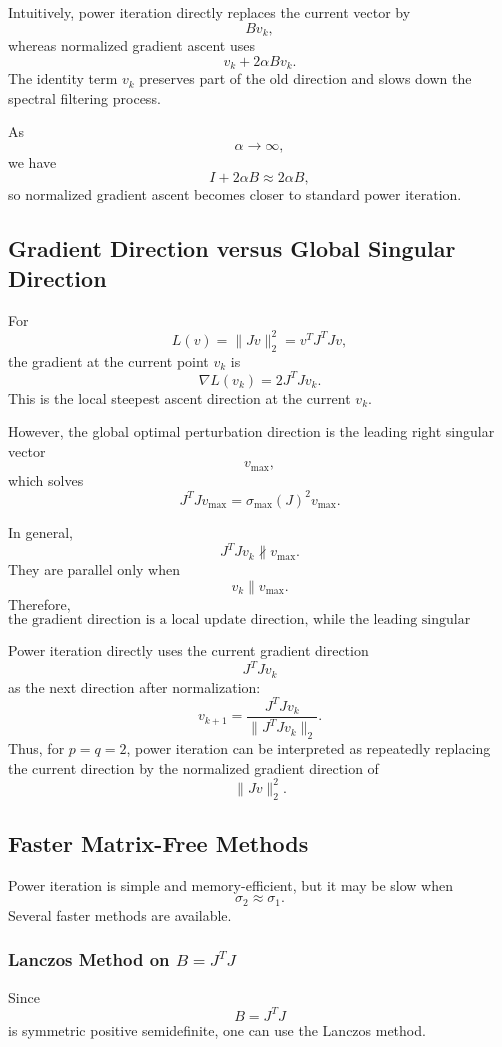 \documentclass{article}
\begin{document}
Intuitively, power iteration directly replaces the current vector by
\[
Bv_k,
\]
whereas normalized gradient ascent uses
\[
v_k+2\alpha Bv_k.
\]
The identity term \(v_k\) preserves part of the old direction and slows down the spectral filtering process.

As
\[
\alpha\to\infty,
\]
we have
\[
I+2\alpha B\approx 2\alpha B,
\]
so normalized gradient ascent becomes closer to standard power iteration.

\subsection{Gradient Direction versus Global Singular Direction}

For
\[
L(v)=\|Jv\|_2^2=v^TJ^TJv,
\]
the gradient at the current point \(v_k\) is
\[
\nabla L(v_k)=2J^TJv_k.
\]
This is the local steepest ascent direction at the current \(v_k\).

However, the global optimal perturbation direction is the leading right singular vector
\[
v_{\max},
\]
which solves
\[
J^TJv_{\max}
=
\sigma_{\max}(J)^2v_{\max}.
\]

In general,
\[
J^TJv_k
\not\parallel
v_{\max}.
\]
They are parallel only when
\[
v_k\parallel v_{\max}.
\]
Therefore,
\[
\boxed{
\text{the gradient direction is a local update direction, while the leading singular vector is the global Rayleigh quotient optimizer.}
}
\]

Power iteration directly uses the current gradient direction
\[
J^TJv_k
\]
as the next direction after normalization:
\[
v_{k+1}
=
\frac{J^TJv_k}{\|J^TJv_k\|_2}.
\]
Thus, for \(p=q=2\), power iteration can be interpreted as repeatedly replacing the current direction by the normalized gradient direction of
\[
\|Jv\|_2^2.
\]

\subsection{Faster Matrix-Free Methods}

Power iteration is simple and memory-efficient, but it may be slow when
\[
\sigma_2\approx \sigma_1.
\]
Several faster methods are available.

\subsubsection{Lanczos Method on \(B=J^TJ\)}

Since
\[
B=J^TJ
\]
is symmetric positive semidefinite, one can use the Lanczos method.
\end{document}
